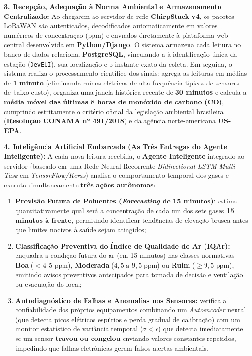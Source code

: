 \documentclass[11pt, a4paper]{article}
\begin{document}
\noindent\textbf{3. Recepção, Adequação à Norma Ambiental e Armazenamento Centralizado:}
Ao chegarem ao servidor de rede \textbf{ChirpStack v4}, os pacotes LoRaWAN são autenticados, decodificados automaticamente em valores numéricos de concentração (ppm) e enviados diretamente à plataforma web central desenvolvida em \textbf{Python/Django}. O sistema armazena cada leitura no banco de dados relacional \textbf{PostgreSQL}, vinculando-a à identificação única da estação (\texttt{DevEUI}), sua localização e o instante exato da coleta. Em seguida, o sistema realiza o processamento científico dos sinais: agrega as leituras em médias de \textbf{1 minuto} (eliminando ruídos elétricos de alta frequência típicos de sensores de baixo custo), organiza uma janela histórica recente de \textbf{30 minutos} e calcula a \textbf{média móvel das últimas 8 horas de monóxido de carbono (CO)}, cumprindo estritamente o critério oficial da legislação ambiental brasileira (\textbf{Resolução CONAMA nº 491/2018}) e da agência norte-americana \textbf{US-EPA}.

\noindent\textbf{4. Inteligência Artificial Embarcada (As Três Entregas do Agente Inteligente):}
A cada nova leitura recebida, o \textbf{Agente Inteligente} integrado ao servidor (baseado em uma Rede Neural Recorrente \emph{Bidirectional LSTM Multi-Task} em \emph{TensorFlow/Keras}) analisa o comportamento temporal dos gases e executa simultaneamente \textbf{três ações autônomas}:
\begin{enumerate}[nosep, leftmargin=1.4cm]
    \item \textbf{Previsão Futura de Poluentes (\emph{Forecasting} de 15 minutos):} estima quantitativamente qual será a concentração de cada um dos sete gases \textbf{15 minutos à frente}, permitindo identificar tendências de elevação brusca antes que limites nocivos à saúde sejam atingidos;
    \item \textbf{Classificação Preventiva do Índice de Qualidade do Ar (IQAr):} enquadra a condição futura do ar (em 15 minutos) nas classes normativas \textbf{Boa} ($< 4{,}5\textrm{ ppm}$), \textbf{Moderada} ($4{,}5\textrm{ a }9{,}5\textrm{ ppm}$) ou \textbf{Ruim} ($\ge 9{,}5\textrm{ ppm}$), emitindo avisos preventivos antecipados para tomada de decisão e ventilação ou evacuação do local;
    \item \textbf{Autodiagnóstico de Falhas e Anomalias nos Sensores:} verifica a confiabilidade dos próprios equipamentos combinando um \emph{Autoencoder} neural (que detecta picos elétricos espúrios e perda gradual de calibração) com um monitor estatístico de variância temporal ($\sigma < \epsilon$) que detecta imediatamente se um sensor \textbf{travou ou congelou} enviando valores constantes repetidos, impedindo que falhas eletrônicas gerem falsos alertas ambientais.
\end{enumerate}
\end{document}
